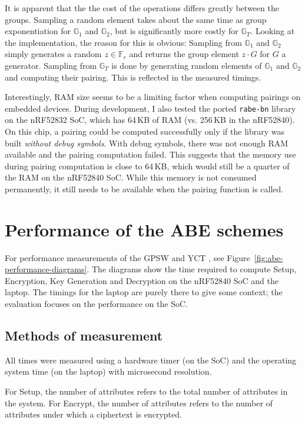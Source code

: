 It is apparent that the the cost of the operations differs greatly between the groups. 
Sampling a random element takes about the same time as group exponentiation for $\mathbb{G}_1$ and $\mathbb{G}_2$, but is significantly more costly for $\mathbb{G}_T$.
Looking at the implementation, the reason for this is obvious: Sampling from $\mathbb{G}_1$ and $\mathbb{G}_2$ simply generates a random $z \in \mathbb{F}_r$ and returns the group element $z \cdot G$ for $G$ a generator.
Sampling from $\mathbb{G}_T$ is done by generating random elements of $\mathbb{G}_1$ and $\mathbb{G}_2$ and computing their pairing.
This is reflected in the measured timings.

Interestingly, RAM size seems to be a limiting factor when computing pairings on embedded devices.
During development, I also tested the ported \texttt{rabe-bn} library on the nRF52832 SoC, which has 64\,KB of RAM (vs. 256\,KB in the nRF52840). 
On this chip, a pairing could be computed successfully only if the library was built \emph{without debug symbols}.
With debug symbols, there was not enough RAM available and the pairing computation failed.
This suggests that the memory use during pairing computation is close to 64\,KB, which would still be a quarter of the RAM on the nRF52840 SoC.
While this memory is not consumed permanently, it still needs to be available when the pairing function is called.

\section{Performance of the ABE schemes}

For performance measurements of the GPSW and YCT , see Figure~\ref{fig:abe-performance-diagrams}. 
The diagrams show the time required to compute Setup, Encryption, Key Generation and Decryption on the nRF52840 SoC and the laptop.
The timings for the laptop are purely there to give some context; the evaluation focuses on the performance on the SoC.



\subsection{Methods of measurement}

All times were measured using a hardware timer (on the SoC) and the operating system time (on the laptop) with microsecond resolution.

For Setup, the number of attributes refers to the total number of attributes in the system.
For Encrypt, the number of attributes refers to the number of attributes under which a ciphertext is encrypted.

